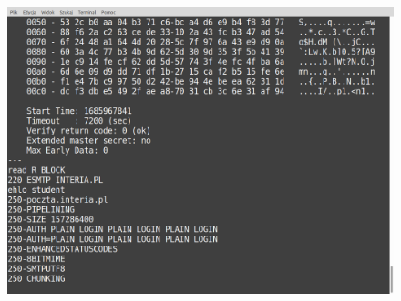 \begin{enumerate}[label=\textbf{6.\arabic*}]
\begin{figure}[h]
\end{figure}  
 \begin{figure}[h]
\centering
\includegraphics[scale=0.25]{./images/answers/smtp2.png}
\end{figure} 


\end{enumerate}
